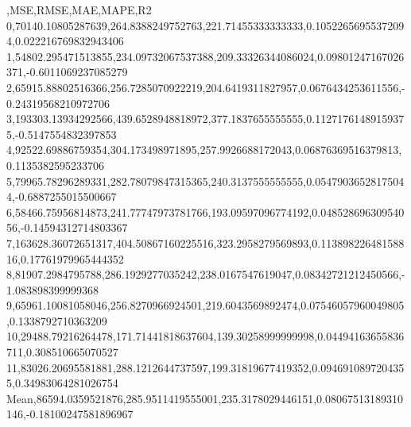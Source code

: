 ,MSE,RMSE,MAE,MAPE,R2
0,70140.10805287639,264.8388249752763,221.71455333333333,0.10522656955372094,0.022216769832943406
1,54802.295471513855,234.09732067537388,209.33326344086024,0.09801247167026371,-0.6011069237085279
2,65915.88802516366,256.7285070922219,204.6419311827957,0.0676434253611556,-0.24319568210972706
3,193303.13934292566,439.6528948818972,377.1837655555555,0.11271761489159375,-0.5147554832397853
4,92522.69886759354,304.173498971895,257.9926688172043,0.06876369516379813,0.1135382595233706
5,79965.78296289331,282.78079847315365,240.3137555555555,0.05479036528175044,-0.6887255015500667
6,58466.75956814873,241.77747973781766,193.09597096774192,0.04852869630954056,-0.14594312714803367
7,163628.36072651317,404.50867160225516,323.2958279569893,0.11389822648158816,0.17761979965444352
8,81907.2984795788,286.1929277035242,238.0167547619047,0.08342721212450566,-1.083898399999368
9,65961.10081058046,256.8270966924501,219.6043569892474,0.07546057960049805,0.1338792710363209
10,29488.79216264478,171.71441818637604,139.30258999999998,0.04494163655836711,0.308510665070527
11,83026.20695581881,288.1212644737597,199.31819677419352,0.0946910897204355,0.34983064281026754
Mean,86594.0359521876,285.9511419555001,235.3178029446151,0.08067513189310146,-0.18100247581896967
